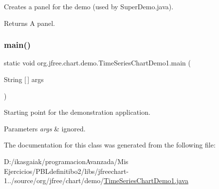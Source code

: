 Creates a panel for the demo (used by Super\+Demo.\+java).

\begin{DoxyReturn}{Returns}
A panel. 
\end{DoxyReturn}
\mbox{\label{classorg_1_1jfree_1_1chart_1_1demo_1_1_time_series_chart_demo1_a7ddf9e3f43f8ad1236f71447089cbfdd}} 
\subsubsection{\texorpdfstring{main()}{main()}}
{\footnotesize\ttfamily static void org.\+jfree.\+chart.\+demo.\+Time\+Series\+Chart\+Demo1.\+main (\begin{DoxyParamCaption}\item[{String \mbox{[}$\,$\mbox{]}}]{args }\end{DoxyParamCaption})\hspace{0.3cm}{\ttfamily [static]}}

Starting point for the demonstration application.


\begin{DoxyParams}{Parameters}
{\em args} & ignored. \\
\hline
\end{DoxyParams}


The documentation for this class was generated from the following file\+:\begin{DoxyCompactItemize}
\item 
D\+:/ikasgaiak/programacion\+Avanzada/\+Mis Ejercicios/\+P\+B\+Ldefinitibo2/libs/jfreechart-\/1../source/org/jfree/chart/demo/\mbox{\hyperlink{_time_series_chart_demo1_8java}{Time\+Series\+Chart\+Demo1.\+java}}\end{DoxyCompactItemize}

